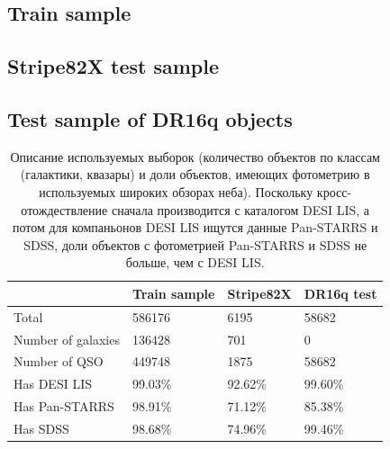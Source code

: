 \documentclass[fleqn,usenatbib]{mnras}
\begin{document}
\subsection{Train sample}
\subsection{Stripe82X test sample}
\subsection{Test sample of DR16q objects}
\begin{table}
	\begin{tabular}{llll}
            \hline
            {} & Train sample & Stripe82X & DR16q test \\
            \hline
            Total              &       586176 &      6195 &      58682 \\
            Number of galaxies &       136428 &       701 &          0 \\
            Number of QSO      &       449748 &      1875 &      58682 \\
            \hline
            Has DESI LIS       &      99.03\% &   92.62\% &    99.60\% \\
            Has Pan-STARRS     &      98.91\% &   71.12\% &    85.38\% \\
            Has SDSS           &      98.68\% &   74.96\% &    99.46\% \\
            \hline
            \end{tabular}
            \caption{Описание используемых выборок (количество объектов по классам (галактики, квазары) и доли объектов, имеющих фотометрию в используемых широких обзорах неба). Поскольку кросс-отождествление сначала производится с каталогом DESI LIS, а потом для компаньонов DESI LIS ищутся данные Pan-STARRS и SDSS, доли объектов с фотометрией Pan-STARRS и SDSS не больше, чем с DESI LIS.}
\end{table}
\end{document}
